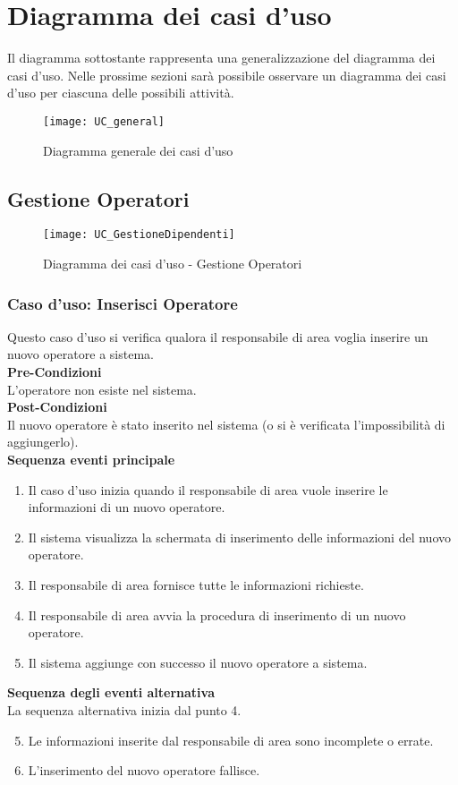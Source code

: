 \documentclass[green, fancy, 11pt]{elegantbook}
\begin{document}
\section{Diagramma dei casi d'uso}

Il diagramma sottostante rappresenta una generalizzazione del diagramma dei casi d'uso. Nelle prossime sezioni sarà possibile osservare un diagramma dei casi d'uso per ciascuna delle possibili attività.\\
\small
\begin{figure}[H]
	\centering
	\texttt{[image: UC\_general]}
	\caption{Diagramma generale dei casi d'uso}
\end{figure}
\newpage
\subsection{Gestione Operatori}
\begin{figure}[H]
	\centering
	\texttt{[image: UC\_GestioneDipendenti]}
	\caption{Diagramma dei casi d'uso - Gestione Operatori}
\end{figure}

\subsubsection{Caso d'uso: Inserisci Operatore}

Questo caso d’uso si verifica qualora il responsabile di area voglia inserire un nuovo operatore a sistema.\\
\textbf{Pre-Condizioni}\\
L’operatore non esiste nel sistema.\\
\textbf{Post-Condizioni}\\
Il nuovo operatore è stato inserito nel sistema (o si è verificata l’impossibilità di aggiungerlo).\\
\textbf{Sequenza eventi principale}
\begin{enumerate}
	\item Il caso d’uso inizia quando il responsabile di area vuole inserire le informazioni di un nuovo operatore.
	\item Il sistema visualizza la schermata di inserimento delle informazioni del nuovo operatore.
	\item Il responsabile di area fornisce tutte le informazioni richieste.
	\item Il responsabile di area avvia la procedura di inserimento di un nuovo operatore.
	\item Il sistema aggiunge con successo il nuovo operatore a sistema.
\end{enumerate}
\textbf{Sequenza degli eventi alternativa}\\
La sequenza alternativa inizia dal punto 4.
\begin{enumerate}
	\setcounter{enumi}{4}
	\item Le informazioni inserite dal responsabile di area sono incomplete o errate.
	\item L’inserimento del nuovo operatore fallisce.
\end{enumerate}
\newpage
\end{document}

